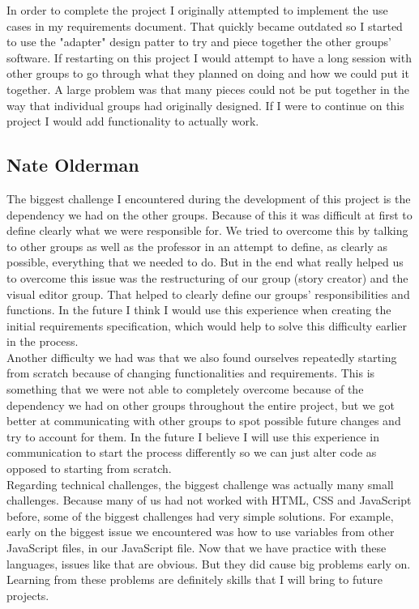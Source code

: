 \documentclass[12pt]{article}
\begin{document}
In order to complete the project I originally attempted to implement the use cases in my requirements document. That quickly became outdated so I started to use the "adapter" design patter to try and piece together the other groups' software. If restarting on this project I would attempt to have a long session with other groups to go through what they planned on doing and how we could put it together.  A large problem was that many pieces could not be put together in the way that individual groups had originally designed. If I were to continue on this project I would add functionality to actually work.

\subsection{Nate Olderman}
The biggest challenge I encountered during the development of this project is the dependency we had on the other groups. Because of this it was difficult at first to define clearly what we were responsible for. We tried to overcome this by talking to other groups as well as the professor in an attempt to define, as clearly as possible, everything that we needed to do. But in the end what really helped us to overcome this issue was the restructuring of our group (story creator) and the visual editor group. That helped to clearly define our groups' responsibilities and functions. In the future I think I would use this experience when creating the initial requirements specification, which would help to solve this difficulty earlier in the process. \\

Another difficulty we had was that we also found ourselves repeatedly starting from scratch because of changing functionalities and requirements. This is something that we were not able to completely overcome because of the dependency we had on other groups throughout the entire project, but we got better at communicating with other groups to spot possible future changes and try to account for them. In the future I believe I will use this experience in communication to start the process differently so we can just alter code as opposed to starting from scratch. \\

Regarding technical challenges, the biggest challenge was actually many small challenges. Because many of us had not worked with HTML, CSS and JavaScript before, some of the biggest challenges had very simple solutions. For example, early on the biggest issue we encountered was how to use variables from other JavaScript files, in our JavaScript file. Now that we have practice with these languages, issues like that are obvious. But they did cause big problems early on. Learning from these problems are definitely skills that I will bring to future projects. \\
\end{document}
